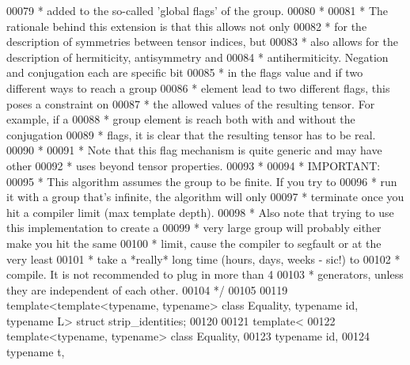 \begin{DoxyCode}
00079 \textcolor{comment}{ * added to the so-called 'global flags' of the group.}
00080 \textcolor{comment}{ *}
00081 \textcolor{comment}{ * The rationale behind this extension is that this allows not only}
00082 \textcolor{comment}{ * for the description of symmetries between tensor indices, but}
00083 \textcolor{comment}{ * also allows for the description of hermiticity, antisymmetry and}
00084 \textcolor{comment}{ * antihermiticity. Negation and conjugation each are specific bit}
00085 \textcolor{comment}{ * in the flags value and if two different ways to reach a group}
00086 \textcolor{comment}{ * element lead to two different flags, this poses a constraint on}
00087 \textcolor{comment}{ * the allowed values of the resulting tensor. For example, if a}
00088 \textcolor{comment}{ * group element is reach both with and without the conjugation}
00089 \textcolor{comment}{ * flags, it is clear that the resulting tensor has to be real.}
00090 \textcolor{comment}{ *}
00091 \textcolor{comment}{ * Note that this flag mechanism is quite generic and may have other}
00092 \textcolor{comment}{ * uses beyond tensor properties.}
00093 \textcolor{comment}{ *}
00094 \textcolor{comment}{ * IMPORTANT: }
00095 \textcolor{comment}{ *     This algorithm assumes the group to be finite. If you try to}
00096 \textcolor{comment}{ *     run it with a group that's infinite, the algorithm will only}
00097 \textcolor{comment}{ *     terminate once you hit a compiler limit (max template depth).}
00098 \textcolor{comment}{ *     Also note that trying to use this implementation to create a}
00099 \textcolor{comment}{ *     very large group will probably either make you hit the same}
00100 \textcolor{comment}{ *     limit, cause the compiler to segfault or at the very least}
00101 \textcolor{comment}{ *     take a *really* long time (hours, days, weeks - sic!) to}
00102 \textcolor{comment}{ *     compile. It is not recommended to plug in more than 4}
00103 \textcolor{comment}{ *     generators, unless they are independent of each other.}
00104 \textcolor{comment}{ */}
00105 
00119 \textcolor{keyword}{template}<\textcolor{keyword}{template}<\textcolor{keyword}{typename}, \textcolor{keyword}{typename}> \textcolor{keyword}{class }Equality, \textcolor{keyword}{typename} id, \textcolor{keyword}{typename} L> \textcolor{keyword}{struct }strip\_identities;
00120 
00121 \textcolor{keyword}{template}<
00122   \textcolor{keyword}{template}<\textcolor{keyword}{typename}, \textcolor{keyword}{typename}> \textcolor{keyword}{class }Equality,
00123   \textcolor{keyword}{typename} id,
00124   \textcolor{keyword}{typename} t,

\end{DoxyCode}
